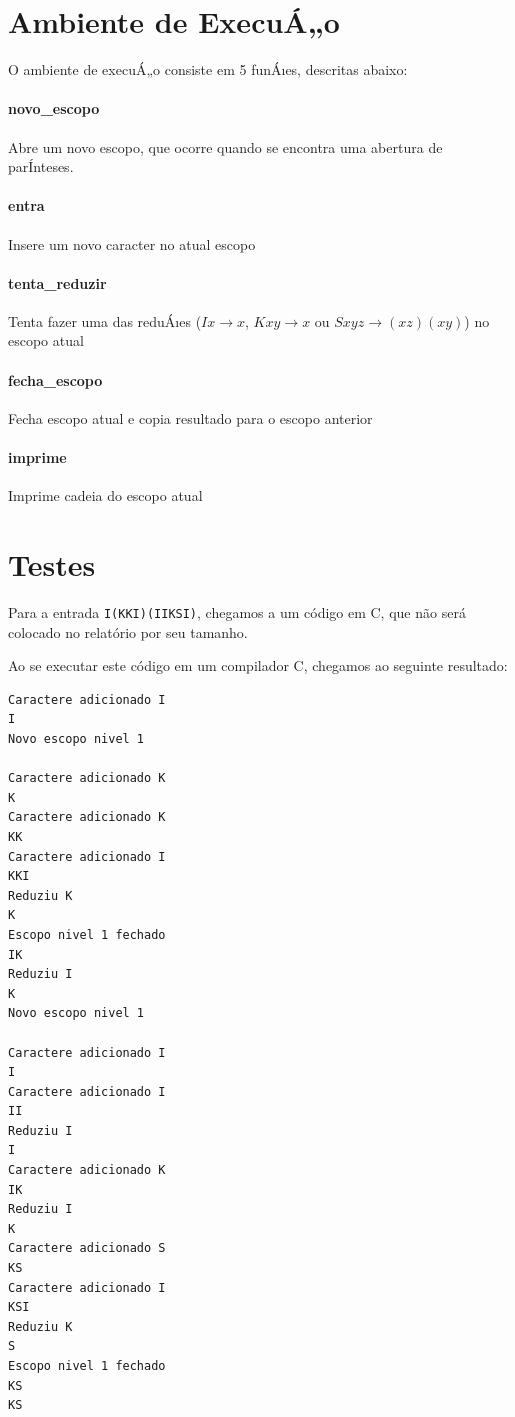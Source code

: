 \documentclass[12pt,a4paper]{article}
\begin{document}
\section{Ambiente de ExecuÁ„o}

O ambiente de execuÁ„o consiste em 5 funÁıes, descritas abaixo:

\paragraph{novo\_escopo} Abre um novo escopo, que ocorre quando se encontra uma abertura de parÍnteses.

\paragraph{entra} Insere um novo caracter no atual escopo

\paragraph{tenta\_reduzir} Tenta fazer uma das reduÁıes ($I x \rightarrow x$, $K x y \rightarrow x$ ou $S x y z \rightarrow ( x z ) ( x y )$) no escopo atual

\paragraph{fecha\_escopo} Fecha escopo atual e copia resultado para o escopo anterior

\paragraph{imprime} Imprime cadeia do escopo atual

\section{Testes}


Para a entrada \verb|I(KKI)(IIKSI)|, chegamos a um código em C, que não será colocado no relatório por seu tamanho.

Ao se executar este código em um compilador C, chegamos ao seguinte resultado:

\begin{verbatim}
Caractere adicionado I
I
Novo escopo nivel 1

Caractere adicionado K
K
Caractere adicionado K
KK
Caractere adicionado I
KKI
Reduziu K
K
Escopo nivel 1 fechado
IK
Reduziu I
K
Novo escopo nivel 1

Caractere adicionado I
I
Caractere adicionado I
II
Reduziu I
I
Caractere adicionado K
IK
Reduziu I
K
Caractere adicionado S
KS
Caractere adicionado I
KSI
Reduziu K
S
Escopo nivel 1 fechado
KS
KS

\end{verbatim}
\end{document}
